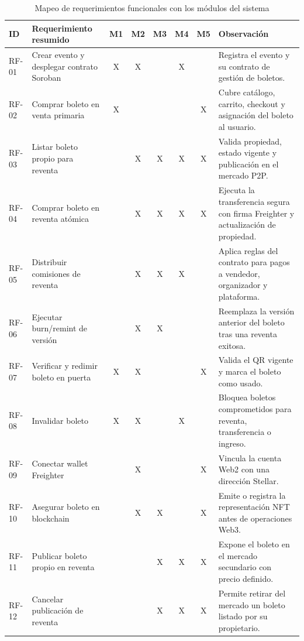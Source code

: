 \documentclass[12pt,letterpaper]{article}
\begin{document}
\begin{table}[htbp]
\centering
\scriptsize
\caption{Mapeo de requerimientos funcionales con los módulos del sistema}
\label{tab:mapeo_requerimientos_modulos}

\begin{tabularx}{\textwidth}{|p{1.2cm}|X|c|c|c|c|c|X|}
\hline
\textbf{ID} & \textbf{Requerimiento resumido} & \textbf{M1} & \textbf{M2} & \textbf{M3} & \textbf{M4} & \textbf{M5} & \textbf{Observación} \\ \hline

RF-01 & Crear evento y desplegar contrato Soroban & X & X &  & X &  & Registra el evento y su contrato de gestión de boletos. \\ \hline
RF-02 & Comprar boleto en venta primaria & X &  &  &  & X & Cubre catálogo, carrito, checkout y asignación del boleto al usuario. \\ \hline
RF-03 & Listar boleto propio para reventa &  & X & X & X & X & Valida propiedad, estado vigente y publicación en el mercado P2P. \\ \hline
RF-04 & Comprar boleto en reventa atómica &  & X & X & X & X & Ejecuta la transferencia segura con firma Freighter y actualización de propiedad. \\ \hline
RF-05 & Distribuir comisiones de reventa &  & X & X & X &  & Aplica reglas del contrato para pagos a vendedor, organizador y plataforma. \\ \hline
RF-06 & Ejecutar burn/remint de versión &  & X & X &  &  & Reemplaza la versión anterior del boleto tras una reventa exitosa. \\ \hline
RF-07 & Verificar y redimir boleto en puerta & X & X &  &  & X & Valida el QR vigente y marca el boleto como usado. \\ \hline
RF-08 & Invalidar boleto & X & X &  & X &  & Bloquea boletos comprometidos para reventa, transferencia o ingreso. \\ \hline
RF-09 & Conectar wallet Freighter &  & X &  &  & X & Vincula la cuenta Web2 con una dirección Stellar. \\ \hline
RF-10 & Asegurar boleto en blockchain &  & X & X &  & X & Emite o registra la representación NFT antes de operaciones Web3. \\ \hline
RF-11 & Publicar boleto propio en reventa &  &  & X & X & X & Expone el boleto en el mercado secundario con precio definido. \\ \hline
RF-12 & Cancelar publicación de reventa &  &  & X & X & X & Permite retirar del mercado un boleto listado por su propietario. \\ \hline

\end{tabularx}
\end{table}
\end{document}
